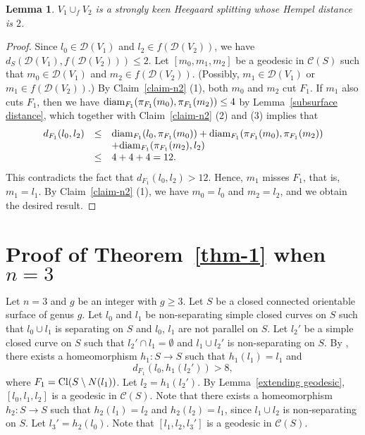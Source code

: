 \documentclass[]{aspm}
\newtheorem{lemma}[definition]{Lemma}
\begin{document}
\begin{lemma}\label{lem-n2}
$V_1\cup_f V_2$ is a strongly keen Heegaard splitting whose Hempel distance is $2$.
\end{lemma}

\begin{proof}
Since $l_0\in \mathcal{D}(V_1)$ and $l_2\in f(\mathcal{D}(V_2))$, we have $d_S(\mathcal{D}(V_1), f(\mathcal{D}(V_2)))\leq 2$.
Let $[m_0, m_1, m_2]$ be a geodesic in $\mathcal{C}(S)$ such that $m_0\in \mathcal{D}(V_1)$ and $m_2\in f(\mathcal{D}(V_2))$.
(Possibly, $m_1\in \mathcal{D}(V_1)$ or $m_1\in  f(\mathcal{D}(V_2))$.)
By Claim~\ref{claim-n2} (1), both $m_0$ and $m_2$ cut $F_1$.
If $m_1$ also cuts $F_1$, then we have ${\rm diam}_{F_1}(\pi_{F_1}(m_0), \pi_{F_1}(m_2))\leq 4$ by Lemma~\ref{subsurface distance}, which together with Claim~\ref{claim-n2} (2) and (3) implies that 
\begin{eqnarray*}
\begin{array}{rcl}
d_{F_1}(l_0, l_2)&\leq& {\rm diam}_{F_1}(l_0, \pi_{F_1}(m_0))+{\rm diam}_{F_1}(\pi_{F_1}(m_0), \pi_{F_1}(m_2))\\
&&+{\rm diam}_{F_1}(\pi_{F_1}(m_2),l_2)\\
&\leq& 4+4+4=12.
\end{array}
\end{eqnarray*}
This contradicts the fact that $d_{F_1}(l_0, l_2)>12$.
Hence, $m_1$ misses $F_1$, that is, $m_1=l_1$.
By Claim~\ref{claim-n2} (1), we have $m_0=l_0$ and $m_2=l_2$, and we obtain the desired result.
\end{proof}




\section{Proof of Theorem~\ref{thm-1} when $n=3$}\label{proof3}


Let $n=3$ and $g$ be an integer with $g\geq 3$.
Let $S$ be a closed connected orientable surface of genus $g$.
Let $l_0$ and $l_1$ be non-separating simple closed curves on $S$ such that $l_0\cup l_1$ is separating on $S$ and $l_{0}$, $l_{1}$ are not parallel on $S$.
Let $l_2'$ be a simple closed curve on $S$ such that $l_2'\cap l_1=\emptyset$ and $l_1\cup l_2'$ is non-separating on $S$.
By \cite[Proposition 4.6]{MM1}, there exists a homeomorphism $h_1:S\rightarrow S$ such that $h_1(l_1)=l_1$ and $$d_{F_1}(l_0, h_1(l_2'))>8,$$ where $F_1={\rm Cl}(S\setminus N(l_1))$.
Let $l_2=h_1(l_2')$.
By Lemma~\ref{extending geodesic}, $[l_0,l_1,l_2]$ is a geodesic in $\mathcal{C}(S)$.
Note that there exists a homeomorphism $h_2:S\rightarrow S$ such that $h_2(l_1)=l_2$ and $h_2(l_2)=l_1$, since $l_1\cup l_2$ is non-separating on $S$.
Let $l_3'=h_2(l_0)$.
Note that $[l_1,l_2,l_3']$ is a geodesic in $\mathcal{C}(S)$.
\end{document}
